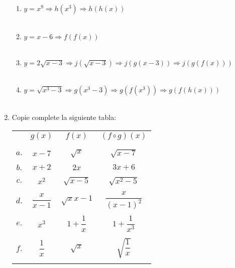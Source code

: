 \begin{enumerate}
\begin{enumerate}[\bfseries a.]
    \item $y=x^9 \Rightarrow h(x^3) \Rightarrow h(h(x))$\\\\
    
    \item $y=x-6 \Rightarrow f(f(x))$\\\\
    
    \item $y=2\sqrt{x-3} \Rightarrow j(\sqrt{x-3}) \Rightarrow j(g(x-3)) \Rightarrow j(g(f(x)))$\\\\
    
    \item $y=\sqrt{x^3-3} \Rightarrow g(x^3-3) \Rightarrow g(f(x^3)) \Rightarrow g(f(h(x)))$\\\\
    
\end{enumerate}

\item Copie complete la siguiente tabla:\\
\begin{center}
    \begin{tabular}{c c c c}
	     & $g(x)$ & $f(x)$ & $(f\circ g)(x)$\\\\
	\hline \\
	$a.$ & $x-7$ & $\sqrt{x}$ & $\sqrt{x-7}$\\\\
	$b.$ & $x+2$ & $2x$ & $3x+6$\\\\
	$c.$ & $x^2$ & $\sqrt{x-5}$ & $\sqrt{x^2-5}$\\\\
	$d.$ & $\dfrac{x}{x-1}$ & $\sqrt{x}{x-1}$ & $\dfrac{x}{(x-1)^2}$\\\\
	$e.$ & $x^3$ & $1+\dfrac{1}{x}$ & $1+\dfrac{1}{x^3}$\\\\
	$f.$ & $\dfrac{1}{x}$ & $\sqrt{x}$ & $\sqrt{\dfrac{1}{x}}$\\\\
    \end{tabular}
\end{center}


\end{enumerate}
